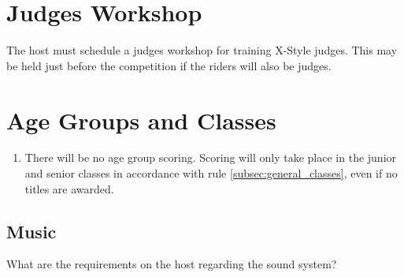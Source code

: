 \section{Judges Workshop}

The host must schedule a judges workshop for training X-Style judges.
This may be held just before the competition if the riders will also be judges.

\section{Age Groups and Classes}

\begin{enumerate}[leftmargin=1.5em,labelsep=*]
	\item There will be no age group scoring. Scoring will only take place in the junior and senior classes in accordance with rule \ref{subsec:general_classes}, even if no titles are awarded.
\end{enumerate}

\begin{comment2016}
\section{Music}

What are the requirements on the host regarding the sound system?
\end{comment2016}
